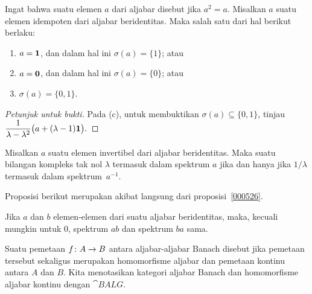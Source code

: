 \begin{prop} Ingat bahwa suatu elemen $a$ dari aljabar disebut
 jika $a^2 = a$. Misalkan $a$ suatu elemen idempoten dari aljabar beridentitas. Maka
salah satu dari hal berikut berlaku:
 \begin{enumerate}[label=\rm{(\alph*)}]
  \item $a = \mathbf{1}$, dan dalam hal ini $\sigma(a) = \{1\}$; atau
  \item $a = \mathbf{0}$, dan dalam hal ini $\sigma(a) = \{0\}$; atau
  \item $\sigma(a) = \{0,1\}$.
 \end{enumerate}
\end{prop}

\begin{proof}[\emph{Petunjuk untuk bukti}] Pada (c), untuk membuktikan $\sigma(a) \subseteq \{0,1\}$,
tinjau $\displaystyle \frac1{\lambda - \lambda^2}\bigl(a + (\lambda - 1)\mathbf{1}\bigr).$ \ns
\end{proof}

\begin{prop} Misalkan $a$ suatu elemen invertibel dari aljabar beridentitas. Maka suatu bilangan kompleks
tak nol $\lambda$ termasuk dalam spektrum $a$ jika dan hanya jika $1/\lambda$ termasuk dalam
spektrum~$a^{-1}$.
\end{prop}

Proposisi berikut merupakan akibat langsung dari proposisi~\ref{000526}.

\begin{prop}\label{000575} Jika $a$ dan $b$ elemen-elemen dari suatu aljabar beridentitas, maka,
kecuali mungkin untuk $0$, spektrum $ab$ dan spektrum $ba$ sama.
\end{prop}

\begin{defn}\label{C035854} Suatu pemetaan $f \colon A \rightarrow B$ antara aljabar-aljabar Banach disebut
 jika pemetaan tersebut sekaligus merupakan homomorfisme
aljabar dan pemetaan kontinu antara $A$ dan $B$. Kita menotasikan kategori
aljabar Banach dan homomorfisme aljabar kontinu dengan $\cat{BALG}$.
\end{defn}

